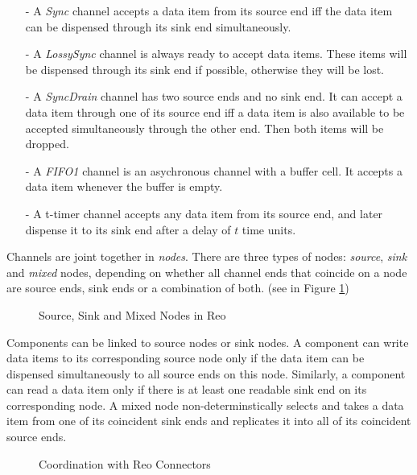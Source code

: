 \documentclass[conference, a4paper]{IEEEtran}
\begin{document}
\begin{itemize}
  \item [-] A \emph{Sync} channel accepts a data item from its source end iff the data item can be
    dispensed through its sink end simultaneously.
  \item [-] A \emph{LossySync} channel is always ready to accept data items. These items will be
    dispensed through its sink end if possible, otherwise they will be lost.
  \item [-] A \emph{SyncDrain} channel has two source ends and no sink end. It can accept a data
    item through one of its source end iff a data item is also available to be accepted
    simultaneously through the other end. Then both items will be dropped.
  \item [-] A \emph{FIFO1} channel is an asychronous channel with a buffer cell. It accepts a
    data item whenever the buffer is empty. 
  \item [-] A t-timer channel accepts any data item from its source end, and later dispense it to
    its sink end after a delay of $t$ time units.

\end{itemize}

Channels are joint together in \emph{nodes}. There are three types of nodes:
\emph{source}, \emph{sink} and \emph{mixed} nodes, depending on whether all channel ends that
coincide on a node are source ends, sink ends or a combination of both.
(see in Figure \ref{fig:node})

\begin{figure}[ht]
  \begin{center}
    
  \end{center}
  \caption{Source, Sink and Mixed Nodes in Reo}
  \label{fig:node}
\end{figure}

Components can be linked to source nodes or sink nodes. A component can write data items to its
corresponding source node only if the data item can be dispensed simultaneously to all source ends
on this node. Similarly, a component can read a data item only if there is at least one readable
sink end on its corresponding node. A mixed node non-determinstically selects and takes a data item
from one of its coincident sink ends and replicates it into all of its coincident source ends.

\begin{figure}[ht]
  \begin{center}
    
  \end{center}
  \caption{Coordination with Reo Connectors}
  \label{fig:reoconnector}
\end{figure}
\end{document}
